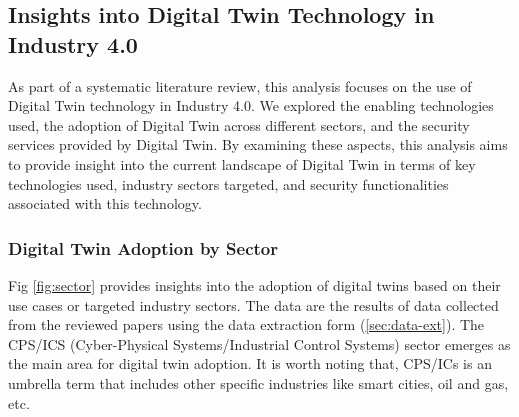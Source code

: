 \subsection{Insights into Digital Twin Technology in Industry 4.0}





As part of a systematic literature review, this analysis focuses on the use of Digital Twin technology in Industry 4.0. We explored the enabling technologies used, the adoption of Digital Twin across different sectors, and the security services provided by Digital Twin. By examining these aspects, this analysis aims to provide insight into the current landscape of Digital Twin in terms of key technologies used, industry sectors targeted, and security functionalities associated with this technology. 

\subsubsection*{Digital Twin Adoption by Sector}
Fig \ref{fig:sector} provides insights into the adoption of digital twins based on their use cases or targeted industry sectors. The data are the results of data collected from the reviewed papers using the data extraction form (\ref{sec:data-ext}). The CPS/ICS (Cyber-Physical Systems/Industrial Control Systems) sector emerges as the main area for digital twin adoption. It is worth noting that, CPS/ICs is an umbrella term that includes other specific industries like smart cities, oil and gas, etc. 


